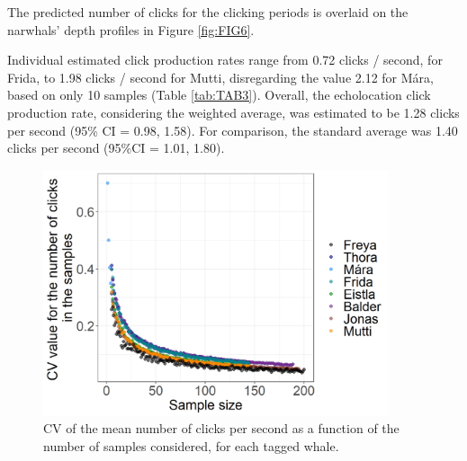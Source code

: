 \documentclass[preprint]{JASA}
\begin{document}
The predicted number of clicks for the clicking periods is overlaid on the narwhals' depth profiles in Figure \ref{fig:FIG6}.

Individual estimated click production rates range from 0.72 clicks / second, for Frida, to  1.98 clicks / second for Mutti, disregarding the value 2.12 for Mára, based on only 10 samples (Table \ref{tab:TAB3}). Overall, the echolocation click production rate, considering the weighted average, was estimated to be 1.28 clicks per second (95\% CI = 0.98, 1.58). For comparison, the standard average was 1.40 clicks per second (95\%CI = 1.01, 1.80).

\begin{figure}[t]
\includegraphics[width=4in]{Figure3}%
\caption{\label{fig:FIG3}{CV of the mean number of clicks per second as a function of the number of samples considered, for each tagged whale.}}
\raggedright

\end{figure}
\end{document}
